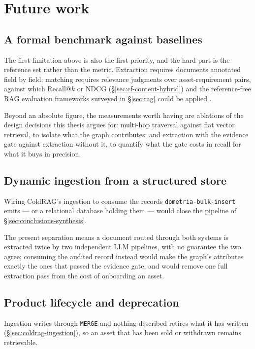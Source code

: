 \section{Future work}
\label{sec:conclusions-future-work}

\subsection{A formal benchmark against baselines}

The first limitation above is also the first priority, and the hard part is the reference set rather than the metric. Extraction requires documents annotated field by field; matching requires relevance judgments over asset-requirement pairs, against which Recall@$k$ or NDCG (\S\ref{sec:cf-content-hybrid}) and the reference-free RAG evaluation frameworks surveyed in \S\ref{sec:rag} could be applied \citep{es2024ragas,chen2024benchmarking}. 


Beyond an absolute figure, the measurements worth having are ablations of the design decisions this thesis argues for: multi-hop traversal against flat vector retrieval, to isolate what the graph contributes; and extraction with the evidence gate against extraction without it, to quantify what the gate costs in recall for what it buys in precision.

\subsection{Dynamic ingestion from a structured store}

Wiring ColdRAG's ingestion to consume the records \texttt{dometria-bulk-insert} emits — or a relational database holding them — would close the pipeline of \S\ref{sec:conclusions-synthesis}. 


The present separation means a document routed through both systems is extracted twice by two independent LLM pipelines, with no guarantee the two agree; consuming the audited record instead would make the graph's attributes exactly the ones that passed the evidence gate, and would remove one full extraction pass from the cost of onboarding an asset.

\subsection{Product lifecycle and deprecation}

Ingestion writes through \texttt{MERGE} and nothing described retires what it has written (\S\ref{sec:coldrag-ingestion}), so an asset that has been sold or withdrawn remains retrievable. 


